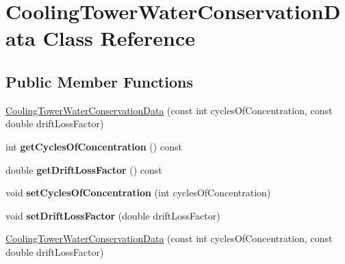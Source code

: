 \hypertarget{class_cooling_tower_water_conservation_data}{}\section{Cooling\+Tower\+Water\+Conservation\+Data Class Reference}
\label{class_cooling_tower_water_conservation_data}
\subsection*{Public Member Functions}
\begin{DoxyCompactItemize}
\item 
\hyperlink{class_cooling_tower_water_conservation_data_a14cdf792dfd962c99a5ad59800d28ff6}{Cooling\+Tower\+Water\+Conservation\+Data} (const int cycles\+Of\+Concentration, const double drift\+Loss\+Factor)
\item 
\mbox{\label{class_cooling_tower_water_conservation_data_a28f6c65b7d5bd5a02c539e9f85948618}} 
int {\bfseries get\+Cycles\+Of\+Concentration} () const
\item 
\mbox{\label{class_cooling_tower_water_conservation_data_a19e62ebc3cc9e41a05d485f3ead65465}} 
double {\bfseries get\+Drift\+Loss\+Factor} () const
\item 
\mbox{\label{class_cooling_tower_water_conservation_data_a99ed26b5455d7f9f59bdb0658de5fa82}} 
void {\bfseries set\+Cycles\+Of\+Concentration} (int cycles\+Of\+Concentration)
\item 
\mbox{\label{class_cooling_tower_water_conservation_data_a3b4df83b89870a1d47e731ab2c409014}} 
void {\bfseries set\+Drift\+Loss\+Factor} (double drift\+Loss\+Factor)
\item 
\hyperlink{class_cooling_tower_water_conservation_data_a14cdf792dfd962c99a5ad59800d28ff6}{Cooling\+Tower\+Water\+Conservation\+Data} (const int cycles\+Of\+Concentration, const double drift\+Loss\+Factor)
\item 
\mbox{\label{class_cooling_tower_water_conservation_data_a28f6c65b7d5bd5a02c539e9f85948618}} 

\end{DoxyCompactItemize}
